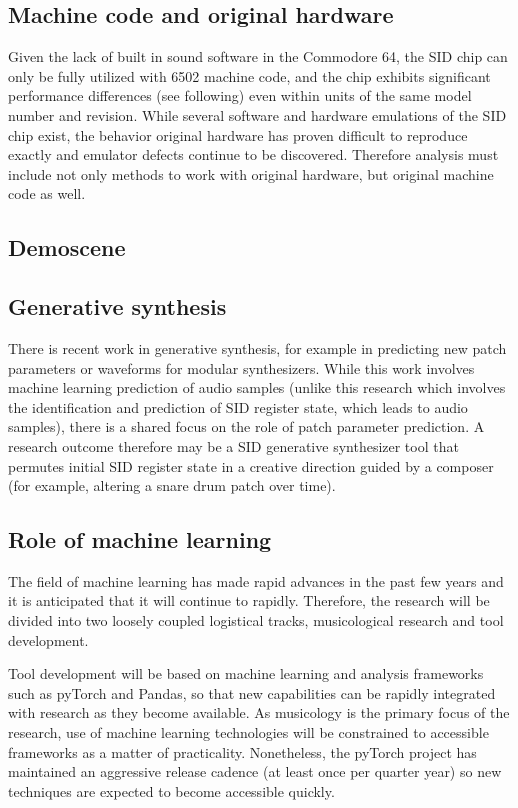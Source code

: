 \documentclass[10pt]{article}
\begin{document}
\begin{multicols*}{2}
  \subsection{Machine code and original hardware}
  Given the lack of built in sound software in the Commodore 64, the
  SID chip can only be fully utilized with 6502 machine code, and the
  chip exhibits significant performance differences (see following)
  even within units of the same model number and revision.  While
  several software and hardware emulations of the SID chip exist, the
  behavior original hardware has proven difficult to reproduce exactly
  and emulator defects continue to be discovered.  Therefore analysis
  must include not only methods to work with original hardware, but
  original machine code as well.

  \subsection{Demoscene}

  \subsection{Generative synthesis}
  There is recent work in generative synthesis, for example in
  predicting new patch parameters or waveforms for modular
  synthesizers.  While this work involves machine learning prediction
  of audio samples (unlike this research which involves the
  identification and prediction of SID register state, which leads to
  audio samples), there is a shared focus on the role of patch
  parameter prediction.  A research outcome therefore may be
  a SID generative synthesizer tool that permutes initial
  SID register state in a creative direction guided by a composer
  (for example, altering a snare drum patch over time).

  \subsection{Role of machine learning}
  The field of machine learning has made rapid advances in the past
  few years and it is anticipated that it will continue to
  rapidly. Therefore, the research will be divided into two loosely
  coupled logistical tracks, musicological research and tool
  development.

  Tool development will be based on machine learning and
  analysis frameworks such as pyTorch and Pandas, so that new
  capabilities can be rapidly integrated with research as they become
  available. As musicology is the primary focus of the research,
  use of machine learning technologies will be constrained to
  accessible frameworks as a matter of practicality. Nonetheless,
  the pyTorch project has maintained an aggressive release cadence
  (at least once per quarter year) so new techniques are expected
  to become accessible quickly.


\end{multicols*}
\end{document}
